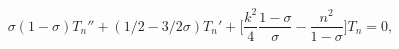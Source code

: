 \begin{equation}
\sigma(1-\sigma) T_n ''  + (1/2 - 3/2 \sigma) T_n ' + \biggl[\frac{k^2}{4}\frac{1-\sigma}{\sigma} - \frac{n^2}{1-\sigma} \biggr] T_n =0 ,
\end{equation}


